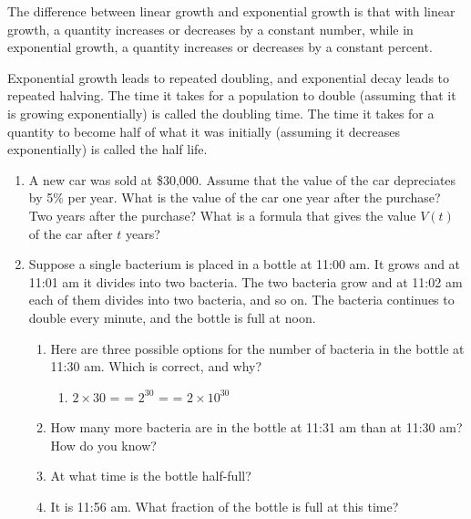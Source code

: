\documentclass[11pt,dvipsnames]{article}
\makeatletter
\newcommand{\inlineitem}[1][]{%
	\ifnum\enit@type=\tw@
	{\descriptionlabel{#1}}
	\hspace{\labelsep}%
	\else
	\ifnum\enit@type=\z@
	\refstepcounter{\@listctr}\fi
	\quad\@itemlabel\hspace{\labelsep}%
	\fi}
\makeatother
\begin{document}
The difference between linear growth and exponential growth is that with linear growth, a quantity increases or decreases by a constant number, while in exponential growth, a quantity increases or decreases by a constant percent.

Exponential growth leads to repeated doubling, and exponential decay leads to repeated halving. The time it takes for a population to double (assuming that it is growing exponentially) is called the doubling time. The time it takes for a quantity to become half of what it was initially (assuming it decreases exponentially) is called the half life.


	\begin{enumerate}[label= {\bf  \arabic*:}, leftmargin=*]
		\item A new car was sold at \$30,000. Assume that the value of the car depreciates by 5\% per year. What is the value of the car one year after the purchase? Two years after the purchase? What is a formula that gives the value $V(t)$ of the car after $t$ years?
		
\item Suppose a single bacterium is placed in a bottle at 11:00 am. It grows and at 11:01 am it divides into two bacteria. The two bacteria grow and at 11:02 am each of them divides into two bacteria, and so on. The bacteria continues to double every minute, and the bottle is full at noon. %

\begin{enumerate}
	\item Here are three possible options for the number of bacteria in the bottle at 11:30 am. Which is correct, and why?
	\begin{enumerate}[label= { \textcolor{blue}{(\Alph*)}}]
		\item $2\times 30$ \inlineitem $\displaystyle 2^{30}$ \inlineitem $\displaystyle 2\times 10^{30}$
	\end{enumerate}
	\item How many more bacteria are in the bottle at 11:31 am than at 11:30 am? How do you know?
\item  At what time is  the bottle half-full? 

\item  It is 11:56 am. What fraction of the bottle is full at this time?
 



\end{enumerate}
\end{enumerate}
\end{document}
